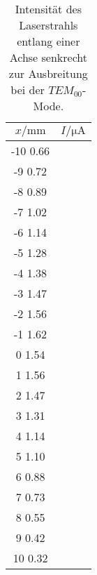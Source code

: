 \begin{table}
    \centering
    \caption{Intensität des Laserstrahls entlang einer Achse senkrecht zur Ausbreitung bei der $TEM_{00}$-Mode.}
    \label{tab:mode00_data}
    \begin{tabular}{c c}
        \toprule
        $x/\si{\milli\meter}$ & $I/\si{\micro\ampere} $ \\
        \midrule
        -10 0.66\\
        -9  0.72\\
        -8  0.89\\
        -7  1.02\\
        -6  1.14\\
        -5  1.28\\
        -4  1.38\\
        -3  1.47\\
        -2  1.56\\
        -1  1.62\\
        0   1.54\\
        1   1.56\\
        2   1.47\\
        3   1.31\\
        4   1.14\\
        5   1.10\\
        6   0.88\\
        7   0.73\\
        8   0.55\\
        9   0.42\\
        10  0.32\\
        \bottomrule
    \end{tabular}
\end{table}

